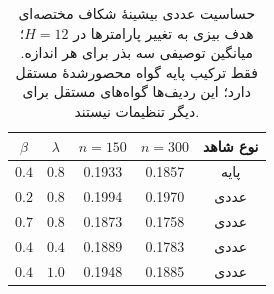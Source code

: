\begin{table}[htbp]
\centering\small
\caption{حساسیت عددی بیشینهٔ شکاف مختصه‌ای هدف بیزی به تغییر پارامترها در $H=12$؛ میانگین توصیفی سه بذر برای هر اندازه. فقط ترکیب پایه گواه محصورشدهٔ مستقل دارد؛ این ردیف‌ها گواه‌های مستقل برای دیگر تنظیمات نیستند.}
\label{tab:ch4-sec411-parameter-sensitivity}
\begin{tabular}{ccccc}\hline
$\beta$ & $\lambda$ & $n=150$ & $n=300$ & نوع شاهد\\ \hline
$0.4$ & $0.8$ & 0.1933 & 0.1857 & پایه \\
$0.2$ & $0.8$ & 0.1994 & 0.1970 & عددی \\
$0.7$ & $0.8$ & 0.1873 & 0.1758 & عددی \\
$0.4$ & $0.4$ & 0.1889 & 0.1783 & عددی \\
$0.4$ & $1.0$ & 0.1948 & 0.1885 & عددی \\
\hline
\end{tabular}
\end{table}
